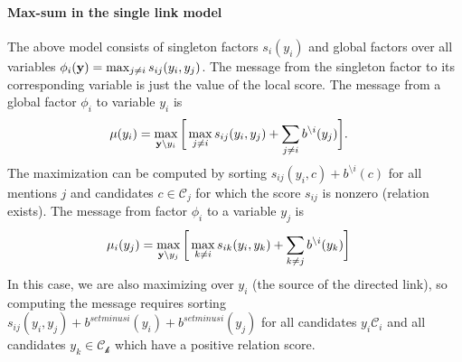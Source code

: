 \paragraph{Max-sum in the single link model}
The above model consists of singleton factors $s_i(y_i)$ and global factors over all variables $\phi_i({\bf y}) = \max_{j \neq i} s_{ij}(y_i, y_j)$.  The message from the singleton factor to its corresponding variable is just the value of the local score. The message from a global factor $\phi_i$ to variable $y_i$ is
\begin{align}
\mu(y_i) &= \max_{{\bf y} \setminus y_i} \bigg[ \max_{j \neq i} s_{ij}(y_i, y_j) + \sum_{j \neq i} b^{\setminus i}(y_j)\bigg].
\end{align}
The maximization can be computed by sorting $s_{ij}(y_i, c) + b^{\setminus i}(c)$ for all mentions $j$ and candidates $c \in \mathcal{C}_j$ for which the score $s_{ij}$ is nonzero (relation exists). The message from factor $\phi_i$ to a variable $y_j$ is
\begin{align}
\mu_i(y_j) &= \max_{{\bf y} \setminus y_j} \bigg[ \max_{k \neq i} s_{ik}(y_i, y_k) + \sum_{k \neq j} b^{\setminus i}(y_k) \bigg]
\end{align}
In this case, we are also maximizing over $y_i$ (the source of the directed link), so computing the message requires sorting $s_{ij}(y_i, y_j) + b^{setminus i}(y_i) + b^{setminus i}(y_j)$ for all candidates $y_i \mathcal{C}_i$ and all candidates $y_k \in \mathcal{C_k}$ which have a positive relation score.
